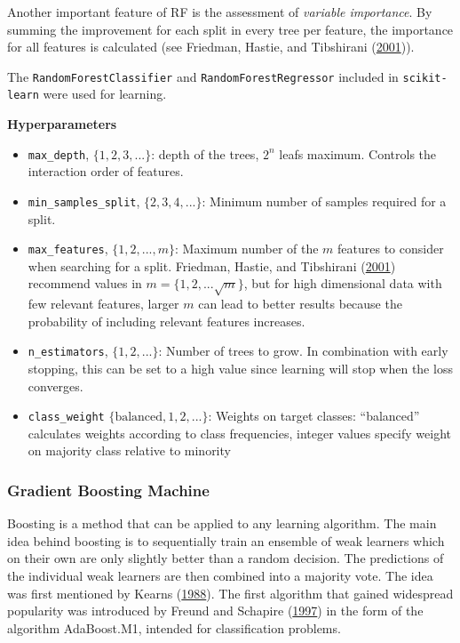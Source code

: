 \documentclass[
  11pt,
  a4paper,
  DIV=12,captions=tableheading,oneside,titlepage=firstiscover,abstracton]{scrreprt}
\providecommand{\tightlist}{%
  \setlength{\itemsep}{0pt}\setlength{\parskip}{0pt}}
\providecommand{\tightlist}{%
  \setlength{\itemsep}{0pt}\setlength{\parskip}{0pt}}
\begin{document}
Another important feature of RF is the assessment of \emph{variable importance}. By summing the improvement for each split in every tree per feature, the importance for all features is calculated (see Friedman, Hastie, and Tibshirani (\protect\hyperlink{ref-friedman2001elements}{2001})).

The \texttt{RandomForestClassifier} and \texttt{RandomForestRegressor} included in \texttt{scikit-learn} were used for learning.

\textbf{Hyperparameters}

\begin{itemize}
\tightlist
\item
  \texttt{max\_depth}, \(\{1,2,3, ...\}\): depth of the trees, \(2^n\) leafs maximum. Controls the interaction order of features.
\item
  \texttt{min\_samples\_split}, \(\{2,3,4,...\}\): Minimum number of samples required for a split.
\item
  \texttt{max\_features}, \(\{1, 2, ..., m\}\): Maximum number of the \(m\) features to consider when searching for a split. Friedman, Hastie, and Tibshirani (\protect\hyperlink{ref-friedman2001elements}{2001}) recommend values in \(m = \{1, 2, ... \sqrt{m}\}\), but for high dimensional data with few relevant features, larger \(m\) can lead to better results because the probability of including relevant features increases.
\item
  \texttt{n\_estimators}, \(\{1, 2, ...\}\): Number of trees to grow. In combination with early stopping, this can be set to a high value since learning will stop when the loss converges.
\item
  \texttt{class\_weight} \(\{\text{balanced}, 1,2,...\}\): Weights on target classes: ``balanced'' calculates weights according to class frequencies, integer values specify weight on majority class relative to minority
\end{itemize}

\hypertarget{gradient-boosting-machine}{%
\subsubsection{Gradient Boosting Machine}\label{gradient-boosting-machine}}

Boosting is a method that can be applied to any learning algorithm. The main idea behind boosting is to sequentially train an ensemble of weak learners which on their own are only slightly better than a random decision. The predictions of the individual weak learners are then combined into a majority vote. The idea was first mentioned by Kearns (\protect\hyperlink{ref-kearns1988thoughts}{1988}). The first algorithm that gained widespread popularity was introduced by Freund and Schapire (\protect\hyperlink{ref-freund1997decision}{1997}) in the form of the algorithm AdaBoost.M1, intended for classification problems.
\end{document}
